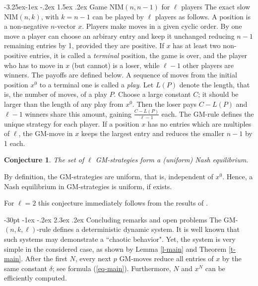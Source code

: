 \documentclass[10pt]{article}
\makeatletter
\renewcommand\section{\@startsection {section}{1}{\z@}
{-30pt \@plus -1ex \@minus -.2ex}
{2.3ex \@plus.2ex}
{\normalfont\normalsize\bfseries\boldmath}}
\renewcommand\subsection{\@startsection{subsection}{2}{\z@}
{-3.25ex\@plus -1ex \@minus -.2ex}
{1.5ex \@plus .2ex}
{\normalfont\normalsize\bfseries\boldmath}}
\newtheorem{conjecture}{Conjecture}
\theoremstyle{definition}
\makeatother
\begin{document}
\subsection{Game NIM$(n,n-1)$  for $\ell$ players} 
The exact slow NIM$(n,k)$, with $k = n-1$  
can be played by $\ell$  players  %
as follows. 
A position is a non-negative $n$-vector  $x$. 
Players make moves in a given cyclic order. 
By one move a player can choose an arbirary 
entry and keep it unchanged 
reducing $n-1$ remaining entries by 1, 
provided they are positive. 
If  $x$  has at least two non-positive entries, 
it is called a {\em terminal} position, 
the game is over, and the player 
who has to move in $x$ (but cannot) is a loser, 
while  $\ell-1$  other players are winners. 
The payoffs are defined below. 
A sequence of moves 
from the initial position  $x^0$ 
to a terminal one is called a {\em play}. 
Let  $L(P)$  denote the length, 
that is, the number of moves, of a play  $P$. 
Choose a large constant $C$; 
it should be larger than the length 
of any play from  $x^0$.  
Then the loser pays $C-L(P)$ 
and $\ell-1$  winners share this amount, 
gaining $\frac{C - L(P)}{\ell-1}$ each. 
The GM-rule defines the unique strategy for each player.
If a position  $x$  has no entries which are multiples of $\ell$, 
the GM-move in $x$ keeps the largest entry and reduces 
the smaller $n-1$ by 1 each. 

\begin{conjecture}
\label{con-1} 
The set of $\ell$ GM-strategies form a (uniform) Nash equilibrium. 
\end{conjecture}

By definition, the GM-strategies are uniform, 
that is, independent of  $x^0$. 
Hence, a  Nash equilibrium in GM-strategies  
is uniform, if exists. 

For $\ell = 2$  this conjecture immediately 
follows from the results of \cite{GMMV23}. 

\section{Concluding remarks %
and open problems} 
The GM-$(n,k,\ell)$-rule defines a deterministic dynamic system. 
It is well known that such systems may demonstrate 
a ``chaotic behavior". 
Yet, the system is very simple in the considered case, 
as shown by Lemma \ref{l-main} and Theorem \ref{t-main}.  
After the first $N$, every next $p$  GM-moves  
reduce all entries of $x$  by the same constant $\delta$; 
see formula (\ref{eq-main}).  
Furthermore, $N$ and $x^N$  can be efficiently computed.
\end{document}
